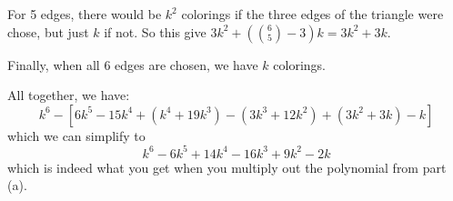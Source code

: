 \documentclass[10pt]{exam}
\begin{document}
\begin{questions}
\begin{parts}
\begin{solution}
    For 5 edges, there would be $k^2$ colorings if the three edges of the triangle were chose, but just $k$ if not.  So this give $3k^2 + (\binom{6}{5}-3)k = 3k^2 + 3k$.
    
    Finally, when all 6 edges are chosen, we have $k$ colorings.
    
    All together, we have:
    \[
    k^6 - \left[6k^5 - 15k^4 + (k^4 + 19k^3) - (3k^3 + 12k^2) + (3k^2 + 3k) - k\right]
    \]
    which we can simplify to 
    \[k^6 - 6k^5 + 14k^4 - 16k^3 + 9k^2 - 2k\]
    which is indeed what you get when you multiply out the polynomial from part (a).
  \end{solution}
\end{parts}







\end{questions}
\end{document}
